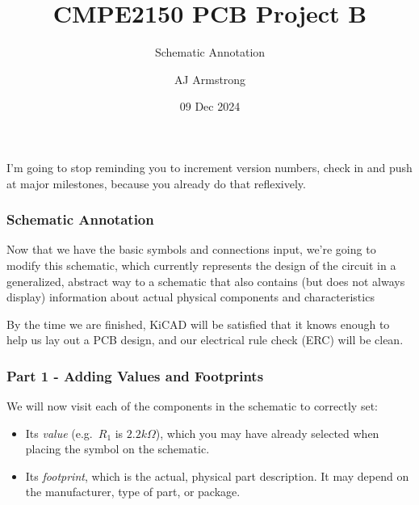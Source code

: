 \documentclass[
  letterpaper,
  DIV=11,
  numbers=noendperiod,
  oneside]{scrartcl}
\title{CMPE2150 PCB Project B}
\subtitle{Schematic Annotation}
\author{AJ Armstrong}
\date{09 Dec 2024}
\providecommand{\tightlist}{%
  \setlength{\itemsep}{0pt}\setlength{\parskip}{0pt}}\usepackage{longtable,booktabs,array}
\renewcommand*\contentsname{Table of contents}
\newcommand\contentsname{Table of contents}
\begin{document}
\maketitle

\renewcommand*\contentsname{Table of contents}
{
\hypersetup{linkcolor=}
\setcounter{tocdepth}{3}
\tableofcontents
}

\begin{tcolorbox}[enhanced jigsaw, opacityback=0, left=2mm, rightrule=.15mm, breakable, arc=.35mm, opacitybacktitle=0.6, colbacktitle=quarto-callout-tip-color!10!white, bottomrule=.15mm, toprule=.15mm, colback=white, colframe=quarto-callout-tip-color-frame, leftrule=.75mm, bottomtitle=1mm, toptitle=1mm, titlerule=0mm, title=\textcolor{quarto-callout-tip-color}{\faLightbulb}\hspace{0.5em}{Tip}, coltitle=black]

I'm going to stop reminding you to increment version numbers, check in
and push at major milestones, because you already do that reflexively.

\end{tcolorbox}

\subsubsection{Schematic Annotation}\label{schematic-annotation}

Now that we have the basic symbols and connections input, we're going to
modify this schematic, which currently represents the design of the
circuit in a generalized, abstract way to a schematic that also contains
(but does not always display) information about actual physical
components and characteristics

By the time we are finished, KiCAD will be satisfied that it knows
enough to help us lay out a PCB design, and our electrical rule check
(ERC) will be clean.

\subsubsection{Part 1 - Adding Values and
Footprints}\label{part-1---adding-values-and-footprints}

We will now visit each of the components in the schematic to correctly
set:

\begin{itemize}
\tightlist
\item
  Its \emph{value} (e.g.~\(R_1\) is \(2.2k\Omega\)), which you may have
  already selected when placing the symbol on the schematic.
\item
  Its \emph{footprint}, which is the actual, physical part description.
  It may depend on the manufacturer, type of part, or package.
\end{itemize}
\end{document}
